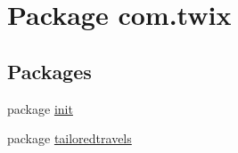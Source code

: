 \hypertarget{namespacecom_1_1twix}{\section{Package com.\-twix}
\label{namespacecom_1_1twix}
}
\subsection*{Packages}
\begin{DoxyCompactItemize}
\item 
package \hyperlink{namespacecom_1_1twix_1_1init}{init}
\item 
package \hyperlink{namespacecom_1_1twix_1_1tailoredtravels}{tailoredtravels}
\end{DoxyCompactItemize}
